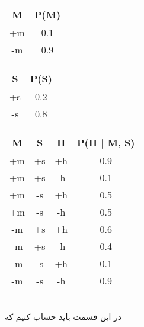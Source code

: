 \documentclass[]{article}
\begin{document}
\printheader

\\\noindent
\begin{latin}
    \centering
\end{latin}
\vspace{1cm}
\begin{latin}
    \centering
    \begin{tabular}{|c|c|}
        \hline
        M & P(M)\\
        \hline
        +m & 0.1\\
        \hline
        -m & 0.9\\
        \hline
    \end{tabular}
    \quad
    \begin{tabular}{|c|c|}
        \hline
        S & P(S)\\
        \hline
        +s & 0.2\\
        \hline
        -s & 0.8\\
        \hline
    \end{tabular}
    \quad
    \begin{tabular}{|c|c|c|c|}
        \hline
        M & S & H & P(H | M, S)\\
        \hline
        +m & +s & +h & 0.9\\
        \hline
        +m & +s & -h & 0.1\\
        \hline
        +m & -s & +h & 0.5\\
        \hline
        +m & -s & -h & 0.5\\
        \hline
        -m & +s & +h & 0.6\\
        \hline
        -m & +s & -h & 0.4\\
        \hline
        -m & -s & +h & 0.1\\
        \hline
        -m & -s & -h & 0.9\\
        \hline
    \end{tabular}
\end{latin}
\\\noindent
در این قسمت باید حساب کنیم که
\end{document}
